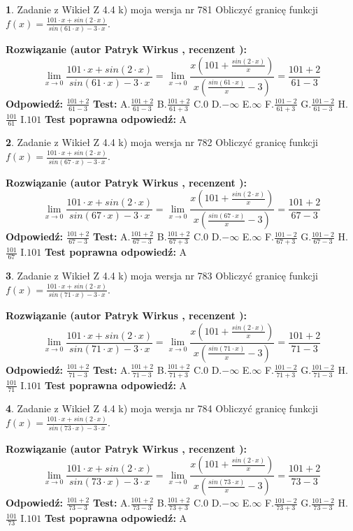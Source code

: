 \documentclass[12pt, a4paper]{article}
\theoremstyle{definition} %
\newtheorem{zad}{}
\newcommand{\zadStart}[1]{\begin{zad}#1\newline}
\newcommand{\zadStop}{\end{zad}}
\newcommand{\rozwStart}[2]{\noindent \textbf{Rozwiązanie (autor #1 , recenzent #2): }\newline}
\newcommand{\rozwStop}{\newline}
\newcommand{\odpStart}{\noindent \textbf{Odpowiedź:}\newline}
\newcommand{\odpStop}{\newline}
\newcommand{\testStart}{\noindent \textbf{Test:}\newline}
\newcommand{\testStop}{\newline}
\newcommand{\kluczStart}{\noindent \textbf{Test poprawna odpowiedź:}\newline}
\newcommand{\kluczStop}{\newline}
\begin{document}
\zadStart{Zadanie z Wikieł Z 4.4 k) moja wersja nr 781}
Obliczyć granicę funkcji $f(x)=\frac{101\cdot x +sin(2\cdot x)}{sin(61\cdot x) -3\cdot x}$.
\zadStop
\rozwStart{Patryk Wirkus}{}
$$\lim\limits_{x\to 0}\frac{101\cdot x +sin(2\cdot x)}{sin(61\cdot x) -3\cdot x}
=\lim\limits_{x\to 0}\frac{x(101+\frac{sin(2\cdot x)}{x})}{x(\frac{sin(61\cdot x)}{x}-3)}
=\frac{101+2}{61-3}$$
\rozwStop
\odpStart
$\frac{101+2}{61-3}$
\odpStop
\testStart
A.$\frac{101+2}{61-3}$
B.$\frac{101+2}{61+3}$
C.$0$
D.$-\infty$
E.$\infty$
F.$\frac{101-2}{61+3}$
G.$\frac{101-2}{61-3}$
H.$\frac{101}{61}$
I.$101$
\testStop
\kluczStart
A
\kluczStop



\zadStart{Zadanie z Wikieł Z 4.4 k) moja wersja nr 782}
Obliczyć granicę funkcji $f(x)=\frac{101\cdot x +sin(2\cdot x)}{sin(67\cdot x) -3\cdot x}$.
\zadStop
\rozwStart{Patryk Wirkus}{}
$$\lim\limits_{x\to 0}\frac{101\cdot x +sin(2\cdot x)}{sin(67\cdot x) -3\cdot x}
=\lim\limits_{x\to 0}\frac{x(101+\frac{sin(2\cdot x)}{x})}{x(\frac{sin(67\cdot x)}{x}-3)}
=\frac{101+2}{67-3}$$
\rozwStop
\odpStart
$\frac{101+2}{67-3}$
\odpStop
\testStart
A.$\frac{101+2}{67-3}$
B.$\frac{101+2}{67+3}$
C.$0$
D.$-\infty$
E.$\infty$
F.$\frac{101-2}{67+3}$
G.$\frac{101-2}{67-3}$
H.$\frac{101}{67}$
I.$101$
\testStop
\kluczStart
A
\kluczStop



\zadStart{Zadanie z Wikieł Z 4.4 k) moja wersja nr 783}
Obliczyć granicę funkcji $f(x)=\frac{101\cdot x +sin(2\cdot x)}{sin(71\cdot x) -3\cdot x}$.
\zadStop
\rozwStart{Patryk Wirkus}{}
$$\lim\limits_{x\to 0}\frac{101\cdot x +sin(2\cdot x)}{sin(71\cdot x) -3\cdot x}
=\lim\limits_{x\to 0}\frac{x(101+\frac{sin(2\cdot x)}{x})}{x(\frac{sin(71\cdot x)}{x}-3)}
=\frac{101+2}{71-3}$$
\rozwStop
\odpStart
$\frac{101+2}{71-3}$
\odpStop
\testStart
A.$\frac{101+2}{71-3}$
B.$\frac{101+2}{71+3}$
C.$0$
D.$-\infty$
E.$\infty$
F.$\frac{101-2}{71+3}$
G.$\frac{101-2}{71-3}$
H.$\frac{101}{71}$
I.$101$
\testStop
\kluczStart
A
\kluczStop



\zadStart{Zadanie z Wikieł Z 4.4 k) moja wersja nr 784}
Obliczyć granicę funkcji $f(x)=\frac{101\cdot x +sin(2\cdot x)}{sin(73\cdot x) -3\cdot x}$.
\zadStop
\rozwStart{Patryk Wirkus}{}
$$\lim\limits_{x\to 0}\frac{101\cdot x +sin(2\cdot x)}{sin(73\cdot x) -3\cdot x}
=\lim\limits_{x\to 0}\frac{x(101+\frac{sin(2\cdot x)}{x})}{x(\frac{sin(73\cdot x)}{x}-3)}
=\frac{101+2}{73-3}$$
\rozwStop
\odpStart
$\frac{101+2}{73-3}$
\odpStop
\testStart
A.$\frac{101+2}{73-3}$
B.$\frac{101+2}{73+3}$
C.$0$
D.$-\infty$
E.$\infty$
F.$\frac{101-2}{73+3}$
G.$\frac{101-2}{73-3}$
H.$\frac{101}{73}$
I.$101$
\testStop
\kluczStart
A
\kluczStop
\end{document}

